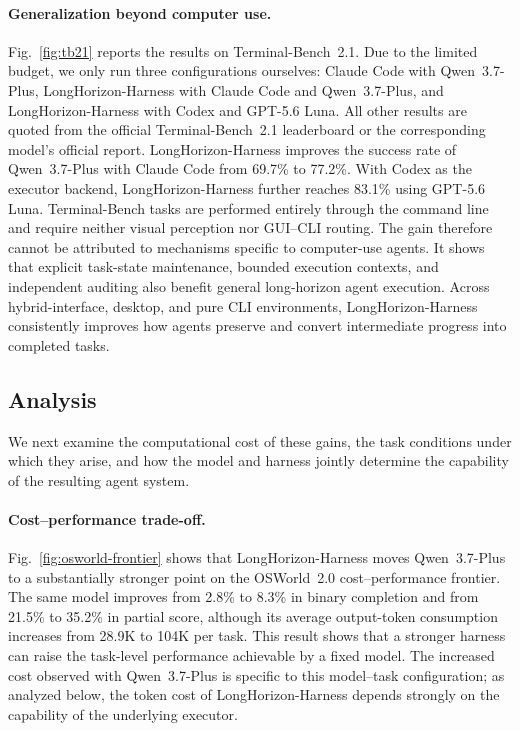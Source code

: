 \paragraph{Generalization beyond computer use.}
Fig.~\ref{fig:tb21} reports the results on Terminal-Bench~2.1. Due to the limited budget, we only run three configurations ourselves: Claude Code with Qwen~3.7-Plus, LongHorizon-Harness with Claude Code and Qwen~3.7-Plus, and LongHorizon-Harness with Codex and GPT-5.6 Luna. All other results are quoted from the official Terminal-Bench~2.1 leaderboard or the corresponding model's official report.
LongHorizon-Harness improves the success rate of Qwen~3.7-Plus with Claude Code from 69.7\% to 77.2\%. With Codex as the executor backend, LongHorizon-Harness further reaches 83.1\% using GPT-5.6 Luna. Terminal-Bench tasks are performed entirely through the command line and require neither visual perception nor GUI--CLI routing. The gain therefore cannot be attributed to mechanisms specific to computer-use agents. It shows that explicit task-state maintenance, bounded execution contexts, and independent auditing also benefit general long-horizon agent execution. Across hybrid-interface, desktop, and pure CLI environments, LongHorizon-Harness consistently improves how agents preserve and convert intermediate progress into completed tasks.

\subsection{Analysis}
\label{sec:exp-analysis}

We next examine the computational cost of these gains, the task conditions under which they arise, and how the model and harness jointly determine the capability of the resulting agent system.

\paragraph{Cost--performance trade-off.}
Fig.~\ref{fig:osworld-frontier} shows that LongHorizon-Harness moves Qwen~3.7-Plus to a substantially stronger point on the OSWorld~2.0 cost--performance frontier. The same model improves from 2.8\% to 8.3\% in binary completion and from 21.5\% to 35.2\% in partial score, although its average output-token consumption increases from 28.9K to 104K per task. This result shows that a stronger harness can raise the task-level performance achievable by a fixed model. The increased cost observed with Qwen~3.7-Plus is specific to this model--task configuration; as analyzed below, the token cost of LongHorizon-Harness depends strongly on the capability of the underlying executor.

